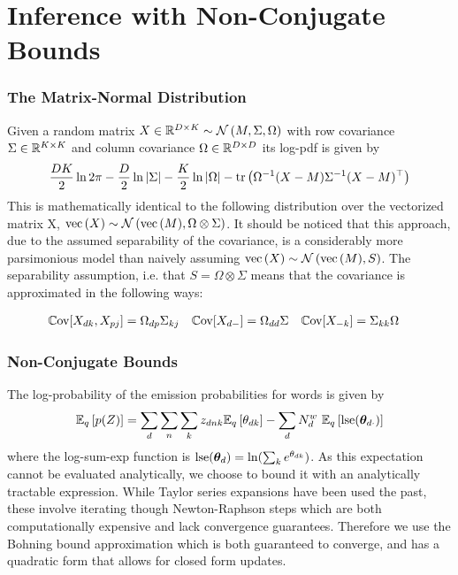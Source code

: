 \section{Inference with Non-Conjugate Bounds}
\subsubsection*{The Matrix-Normal Distribution}
Given a random matrix $X \in \MReal{D}{K} \sim \mnor{M}{\Sigma}{\Omega}$ with row covariance $\Sigma \in \MReal{K}{K}$ and column covariance $\Omega \in \MReal{D}{D}$ its log-pdf is given by
\begin{align}
\halve{DK}\ln 2\pi - \halve{D}\ln|\Sigma| - \halve{K} \ln|\Omega| -\Tr{\inv{\Omega}(X - M)\inv{\Sigma}(X - M)\T}
\end{align}
This is mathematically identical to the following distribution over the vectorized matrix X, $\vecf{X} \sim \nor{\vecf{M}}{\Omega \otimes \Sigma}$. It should be noticed that this approach, due to the assumed separability of the covariance, is a considerably more parsimonious model than naively assuming $\vecf{X} \sim \nor{\vecf{M}}{S}$. The separability assumption, i.e. that $S = \Omega \otimes \Sigma$ means that the covariance is approximated in the following ways:

\begin{align}
\cov{X_{dk}, X_{pj}} & = \Omega_{dp} \Sigma_{kj} &
\cov{X_{d-}} & = \Omega_{dd} \Sigma &
\cov{X_{-k}} & = \Sigma_{kk} \Omega \label{eqn:sep-cov-forms}
\end{align}

\subsubsection*{Non-Conjugate Bounds}
The log-probability of the emission probabilities for words is given by
\begin{align}
\ex{p(Z)}{q} = \sum_d \sum_n \sum_k \zdnk \ex{\thdk}{q} - \sum_d N^w_d \text{ }\ex{\lse(\thdo)}{q}
\end{align}
where the log-sum-exp function is $\lse(\thd) = \ln (\sum_k e^\thdk)$. As this expectation cannot be evaluated analytically, we choose to bound it with an analytically tractable expression. While Taylor series expansions have been used the past\cite{Blei2006}\cite{Wang2013a}, these involve iterating though Newton-Raphson steps which are both computationally expensive and lack convergence guarantees. Therefore we use the Bohning bound approximation\cite{Bohning1988} which is both guaranteed to converge, and has a quadratic form that allows for closed form updates.

